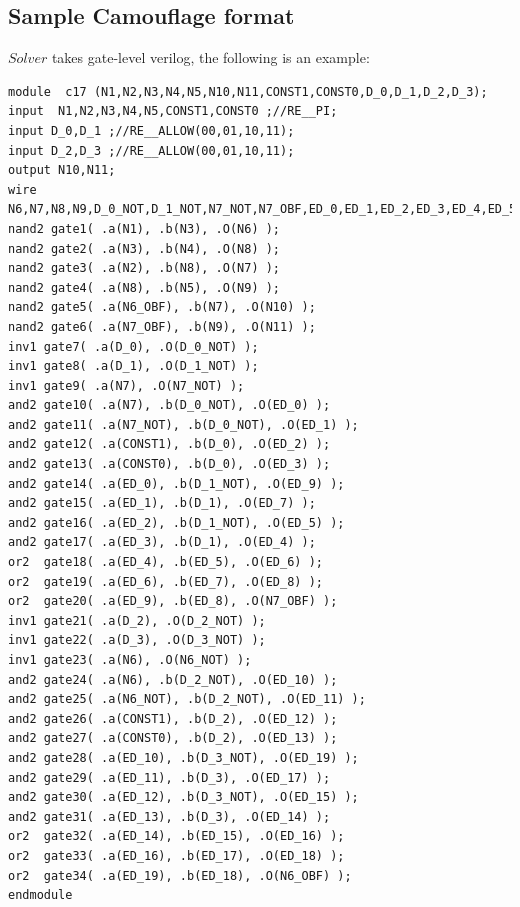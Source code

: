 \documentclass[proposal]{umassthesis}  %
\begin{document}
	\subsection{Sample Camouflage format}
	$Solver$ takes gate-level verilog, the following is an example: 
 	\begin{lstlisting}
module	c17 (N1,N2,N3,N4,N5,N10,N11,CONST1,CONST0,D_0,D_1,D_2,D_3);
input  N1,N2,N3,N4,N5,CONST1,CONST0 ;//RE__PI;
input D_0,D_1 ;//RE__ALLOW(00,01,10,11);
input D_2,D_3 ;//RE__ALLOW(00,01,10,11);
output N10,N11;
wire N6,N7,N8,N9,D_0_NOT,D_1_NOT,N7_NOT,N7_OBF,ED_0,ED_1,ED_2,ED_3,ED_4,ED_5,ED_6,ED_7,ED_8,ED_9,D_2_NOT,D_3_NOT,N6_NOT,N6_OBF,ED_10,ED_11,ED_12,ED_13,ED_14,ED_15,ED_16,ED_17,ED_18,ED_19;   
nand2 gate1( .a(N1), .b(N3), .O(N6) );
nand2 gate2( .a(N3), .b(N4), .O(N8) );
nand2 gate3( .a(N2), .b(N8), .O(N7) );
nand2 gate4( .a(N8), .b(N5), .O(N9) );
nand2 gate5( .a(N6_OBF), .b(N7), .O(N10) );
nand2 gate6( .a(N7_OBF), .b(N9), .O(N11) );
inv1 gate7( .a(D_0), .O(D_0_NOT) );
inv1 gate8( .a(D_1), .O(D_1_NOT) );
inv1 gate9( .a(N7), .O(N7_NOT) );
and2 gate10( .a(N7), .b(D_0_NOT), .O(ED_0) );
and2 gate11( .a(N7_NOT), .b(D_0_NOT), .O(ED_1) );
and2 gate12( .a(CONST1), .b(D_0), .O(ED_2) );
and2 gate13( .a(CONST0), .b(D_0), .O(ED_3) );
and2 gate14( .a(ED_0), .b(D_1_NOT), .O(ED_9) );
and2 gate15( .a(ED_1), .b(D_1), .O(ED_7) );
and2 gate16( .a(ED_2), .b(D_1_NOT), .O(ED_5) );
and2 gate17( .a(ED_3), .b(D_1), .O(ED_4) );
or2  gate18( .a(ED_4), .b(ED_5), .O(ED_6) );
or2  gate19( .a(ED_6), .b(ED_7), .O(ED_8) );
or2  gate20( .a(ED_9), .b(ED_8), .O(N7_OBF) );
inv1 gate21( .a(D_2), .O(D_2_NOT) );
inv1 gate22( .a(D_3), .O(D_3_NOT) );
inv1 gate23( .a(N6), .O(N6_NOT) );
and2 gate24( .a(N6), .b(D_2_NOT), .O(ED_10) );
and2 gate25( .a(N6_NOT), .b(D_2_NOT), .O(ED_11) );
and2 gate26( .a(CONST1), .b(D_2), .O(ED_12) );
and2 gate27( .a(CONST0), .b(D_2), .O(ED_13) );
and2 gate28( .a(ED_10), .b(D_3_NOT), .O(ED_19) );
and2 gate29( .a(ED_11), .b(D_3), .O(ED_17) );
and2 gate30( .a(ED_12), .b(D_3_NOT), .O(ED_15) );
and2 gate31( .a(ED_13), .b(D_3), .O(ED_14) );
or2  gate32( .a(ED_14), .b(ED_15), .O(ED_16) );
or2  gate33( .a(ED_16), .b(ED_17), .O(ED_18) );
or2  gate34( .a(ED_19), .b(ED_18), .O(N6_OBF) );
endmodule
  		\end{lstlisting}
\end{document}
